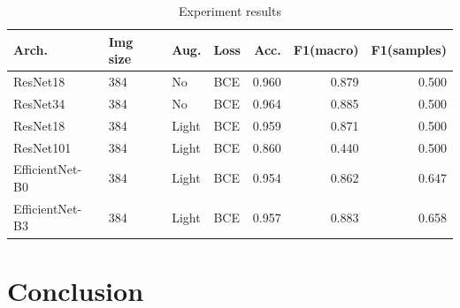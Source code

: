 \documentclass[conference]{IEEEtran}
\begin{document}
\begin{table}[htbp]
\caption{Experiment results}
\begin{center}
\begin{tabular}{llll|rrr}
\textbf{Arch.} & \multicolumn{1}{l}{\textbf{Img size}} & \textbf{Aug.} & \textbf{Loss} & \multicolumn{1}{r}{\textbf{Acc.}} & \multicolumn{1}{r}{\textbf{F1(macro)}} & \multicolumn{1}{r}{\textbf{F1(samples)}} \\ \hline
ResNet18              & 384 & No                    & BCE     & 0.960                                 & 0.879                                  & 0.500                                       \\ 
ResNet34              & 384 & No                    & BCE     & 0.964                                 & 0.885                                  & 0.500                                       \\ 
ResNet18              & 384 & Light                 & BCE     & 0.959                                 & 0.871                                  & 0.500                                       \\ 
ResNet101             & 384 & Light                 & BCE     & 0.860                                 & 0.440                                  & 0.500                                       \\ 
EfficientNet-B0       & 384 & Light                 & BCE     & 0.954                                 & 0.862                                  & 0.647                                    \\ 
EfficientNet-B3       & 384 & Light                 & BCE     & 0.957                                 & 0.883                                  & 0.658                                    \\ \hline
\end{tabular}
\label{table:experiment_results}
\end{center}
\end{table}

\section{Conclusion}
\clearpage



\end{document}

